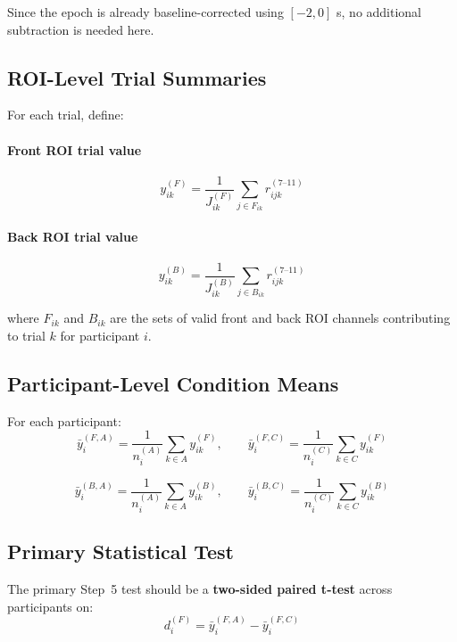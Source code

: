 Since the epoch is already baseline-corrected using \([-2,0]\) s, no additional subtraction is needed here.

\subsection{ROI-Level Trial Summaries}
For each trial, define:

\paragraph{Front ROI trial value}
\begin{equation}
y^{(F)}_{ik}
=
\frac{1}{J^{(F)}_{ik}}
\sum_{j \in F_{ik}} r^{(7\text{--}11)}_{ijk}
\end{equation}

\paragraph{Back ROI trial value}
\begin{equation}
y^{(B)}_{ik}
=
\frac{1}{J^{(B)}_{ik}}
\sum_{j \in B_{ik}} r^{(7\text{--}11)}_{ijk}
\end{equation}

where \(F_{ik}\) and \(B_{ik}\) are the sets of valid front and back ROI channels contributing
to trial \(k\) for participant \(i\).

\subsection{Participant-Level Condition Means}
For each participant:
\begin{equation}
\bar{y}^{(F,A)}_i
=
\frac{1}{n_i^{(A)}}
\sum_{k \in A} y^{(F)}_{ik},
\qquad
\bar{y}^{(F,C)}_i
=
\frac{1}{n_i^{(C)}}
\sum_{k \in C} y^{(F)}_{ik}
\end{equation}

\begin{equation}
\bar{y}^{(B,A)}_i
=
\frac{1}{n_i^{(A)}}
\sum_{k \in A} y^{(B)}_{ik},
\qquad
\bar{y}^{(B,C)}_i
=
\frac{1}{n_i^{(C)}}
\sum_{k \in C} y^{(B)}_{ik}
\end{equation}

\subsection{Primary Statistical Test}
The primary Step~5 test should be a \textbf{two-sided paired t-test} across participants on:
\begin{equation}
d^{(F)}_i = \bar{y}^{(F,A)}_i - \bar{y}^{(F,C)}_i
\end{equation}

